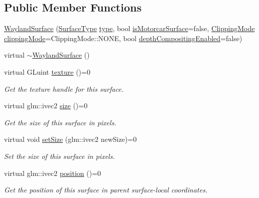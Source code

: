 \subsection*{Public Member Functions}
\begin{DoxyCompactItemize}
\item 
\hyperlink{classmotorcar_1_1WaylandSurface_a12a62c259b5041c6780c703ec2f12f01}{Wayland\-Surface} (\hyperlink{classmotorcar_1_1WaylandSurface_a7715a41b6776800656722407ec01e0a5}{Surface\-Type} \hyperlink{classmotorcar_1_1WaylandSurface_a0e6e5e2455666f607a8ddb2479ba8e88}{type}, bool \hyperlink{classmotorcar_1_1WaylandSurface_a9d7e9cbd9424831e8152bf70d395e397}{is\-Motorcar\-Surface}=false, \hyperlink{classmotorcar_1_1WaylandSurface_ab48793c19a30e8ad689fb4465cd27a70}{Clipping\-Mode} \hyperlink{classmotorcar_1_1WaylandSurface_add06f923d4bd62b3b3cb25d1e5f0ba0c}{clipping\-Mode}=Clipping\-Mode\-::\-N\-O\-N\-E, bool \hyperlink{classmotorcar_1_1WaylandSurface_a09cb70e037726ac4ee36c2aac9be30ae}{depth\-Compositing\-Enabled}=false)
\item 
virtual \hyperlink{classmotorcar_1_1WaylandSurface_a9b6ec8218ecc975308ddb38ddf3dd965}{$\sim$\-Wayland\-Surface} ()
\item 
virtual G\-Luint \hyperlink{classmotorcar_1_1WaylandSurface_aa8ae13d97dae8dfbb610ca6f4ab2b745}{texture} ()=0
\begin{DoxyCompactList}\small\item\em Get the texture handle for this surface. \end{DoxyCompactList}\item 
virtual glm\-::ivec2 \hyperlink{classmotorcar_1_1WaylandSurface_a06182d612aaf0d07780e498066aaca1b}{size} ()=0
\begin{DoxyCompactList}\small\item\em Get the size of this surface in pixels. \end{DoxyCompactList}\item 
virtual void \hyperlink{classmotorcar_1_1WaylandSurface_a7d2ee4e48305c5510916ba9bdcb46a44}{set\-Size} (glm\-::ivec2 new\-Size)=0
\begin{DoxyCompactList}\small\item\em Set the size of this surface in pixels. \end{DoxyCompactList}\item 
virtual glm\-::ivec2 \hyperlink{classmotorcar_1_1WaylandSurface_a22f62be59ac9b8b76a2b2f467f0b1277}{position} ()=0
\begin{DoxyCompactList}\small\item\em Get the position of this surface in parent surface-\/local coordinates. \end{DoxyCompactList}\item 

\end{DoxyCompactItemize}
